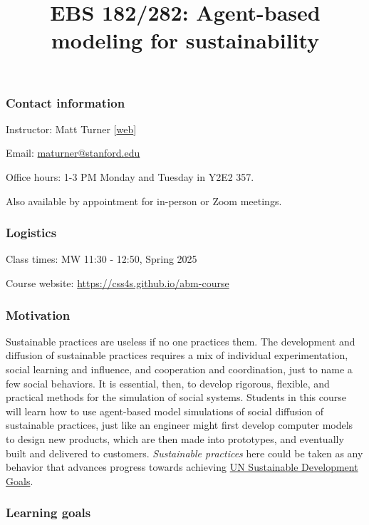 \documentclass[
  letterpaper,
  DIV=11,
  numbers=noendperiod]{scrartcl}
\title{EBS 182/282: Agent-based modeling for sustainability}
\author{}
\date{}
\begin{document}
\maketitle

\subsubsection{Contact information}\label{contact-information}

Instructor: Matt Turner {[}\href{https://mt.digital}{web}{]}

Email: \url{maturner@stanford.edu}

Office hours: 1-3 PM Monday and Tuesday in Y2E2 357.

Also available by appointment for in-person or Zoom meetings.

\subsubsection{Logistics}\label{logistics}

Class times: MW 11:30 - 12:50, Spring 2025

Course website: \url{https://css4s.github.io/abm-course}

\subsubsection{Motivation}\label{motivation}

Sustainable practices are useless if no one practices them. The
development and diffusion of sustainable practices requires a mix of
individual experimentation, social learning and influence, and
cooperation and coordination, just to name a few social behaviors. It is
essential, then, to develop rigorous, flexible, and practical methods
for the simulation of social systems. Students in this course will learn
how to use agent-based model simulations of social diffusion of
sustainable practices, just like an engineer might first develop
computer models to design new products, which are then made into
prototypes, and eventually built and delivered to customers.
\emph{Sustainable practices} here could be taken as any behavior that
advances progress towards achieving \href{https://sdgs.un.org/goals}{UN
Sustainable Development Goals}.

\subsubsection{Learning goals}\label{learning-goals}
\end{document}

